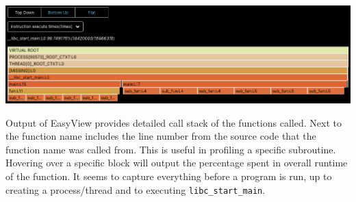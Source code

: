 \documentclass[11pt]{article}
\begin{document}
\centerline{\includegraphics[width=6in]{figures/easyview.png}}

Output of EasyView provides detailed call stack of the functions called. Next to the function name includes the line number from the source code that the function name was called from. This is useful in profiling a specific subroutine. Hovering over a specific block will output the percentage spent in overall runtime of the function. It seems to capture everything before a program is run, up to creating a process/thread and to executing \verb|libc_start_main|.

\end{document}
